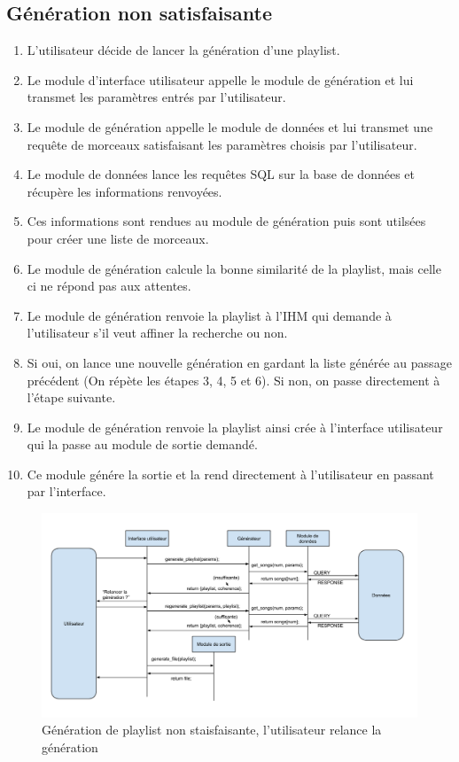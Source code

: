 \subsection{Génération non satisfaisante}
\label{scenarii:gen:nosatis}

\begin{enumerate}
\item L'utilisateur décide de lancer la génération d'une playlist.
\item Le module d'interface utilisateur appelle le module de génération et 
lui transmet les paramètres entrés par l'utilisateur.
\item Le module de génération appelle le module de données et lui transmet 
une requête de morceaux satisfaisant les paramètres choisis par l'utilisateur.
\item Le module de données lance les requêtes SQL sur la base de données et
récupère les informations renvoyées.
\item Ces informations sont rendues au module de génération puis sont 
utilsées pour créer une liste de morceaux.
\item Le module de génération calcule la bonne similarité de la playlist, 
mais celle ci ne répond pas aux attentes.
\item Le module de génération renvoie la playlist à l'IHM qui demande à 
l'utilisateur s'il veut affiner la recherche ou non.
\item Si oui, on lance une nouvelle génération en gardant la liste générée 
au passage précédent (On répète les étapes 3, 4, 5 et 6). Si non, on passe 
directement à l'étape suivante.
\item Le module de génération renvoie la playlist ainsi crée à l'interface 
utilisateur qui la passe au module de sortie demandé.
\item Ce module génére la sortie et la rend directement à l'utilisateur en 
passant par l'interface.
\end{enumerate}

\begin{figure}[H]
\includegraphics[width=\textwidth]{data/scenarii/generation_decevante.png}
\caption{Génération de playlist non staisfaisante, l'utilisateur relance la génération}
\end{figure}
 

